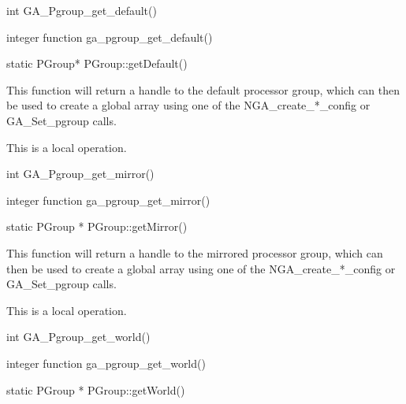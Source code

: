 \documentclass[12pt]{article}
\begin{document}
\begin{capi}
int GA_Pgroup_get_default()
\end{capi}

\begin{fapi}
integer function ga_pgroup_get_default()
\end{fapi}

\begin{cxxapi}
static PGroup* PGroup::getDefault()
\end{cxxapi}

\begin{desc}

This function will return a handle to the default processor group, which can then be used to create a global array using one of the NGA_create_*_config or GA_Set_pgroup calls.

This is a local operation. 
\end{desc}


\begin{capi}
int GA_Pgroup_get_mirror()
\end{capi}

\begin{fapi}
integer function ga_pgroup_get_mirror()
\end{fapi}

\begin{cxxapi}
static PGroup * PGroup::getMirror()
\end{cxxapi}

\begin{desc}

This function will return a handle to the mirrored processor group, which can then be used to create a global array using one of the NGA_create_*_config or GA_Set_pgroup calls.

This is a local operation. 
\end{desc}


\begin{capi}
int GA_Pgroup_get_world()
\end{capi}

\begin{fapi}
integer function ga_pgroup_get_world()
\end{fapi}

\begin{cxxapi}
static PGroup * PGroup::getWorld()
\end{cxxapi}
\end{document}
